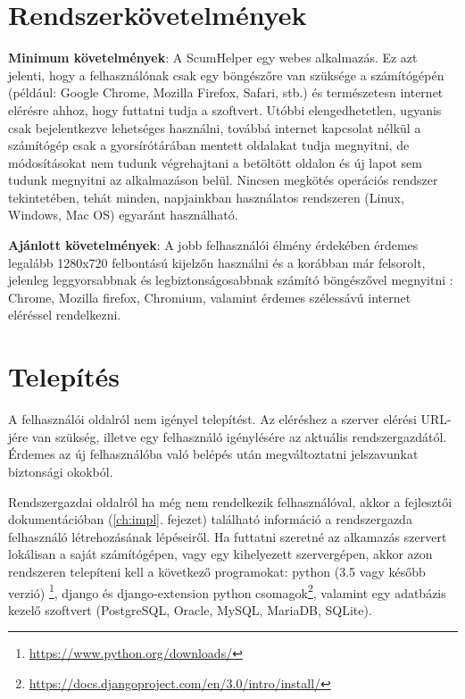 \newpage

\section{Rendszerkövetelmények} %

\textbf{Minimum követelmények}: A ScumHelper egy webes alkalmazás. Ez azt jelenti, hogy a felhasználónak csak egy böngészőre van szüksége a számítógépén (például: Google Chrome, Mozilla Firefox, Safari, stb.) és természetesn internet elérésre ahhoz, hogy futtatni tudja a szoftvert. Utóbbi elengedhetetlen, ugyanis csak bejelentkezve lehetséges használni, továbbá internet kapcsolat nélkül a számítógép csak a gyorsírótárában mentett oldalakat tudja megnyitni, de módosításokat nem tudunk végrehajtani a betöltött oldalon és új lapot sem tudunk megnyitni az alkalmazáson belül. Nincsen megkötés operációs rendszer tekintetében, tehát minden, napjainkban használatos rendszeren (Linux, Windows, Mac OS) egyaránt használható. 

\textbf{Ajánlott követelmények}: A jobb felhasználói élmény érdekében érdemes legalább 1280x720 felbontású kijelzőn használni és a korábban már felsorolt, jelenleg leggyorsabbnak és legbiztonságosabbnak számító böngészővel megnyitni : Chrome, Mozilla firefox, Chromium, valamint érdemes szélessávú internet eléréssel rendelkezni.

\section{Telepítés}
\label{install}

A felhasználói oldalról nem igényel telepítést. Az eléréshez a szerver elérési URL-jére van szükség, illetve egy felhasználó igénylésére az aktuális rendszergazdától. Érdemes az új felhasználóba való belépés után megváltoztatni jelszavunkat biztonsági okokból.

Rendszergazdai oldalról ha még nem rendelkezik felhasználóval, akkor a fejlesztői dokumentációban (\ref{ch:impl}. fejezet) található információ a rendszergazda felhasználó létrehozásának lépéseiről.  Ha futtatni szeretné az alkamazás szervert lokálisan a saját számítógépen, vagy egy kihelyezett szervergépen, akkor azon rendszeren telepíteni kell a következő programokat:  python (3.5 vagy később verzió) \footnote{\url{https://www.python.org/downloads/}}, django és django-extension python csomagok\footnote{\url{https://docs.djangoproject.com/en/3.0/intro/install/}}, valamint egy adatbázis kezelő szoftvert (PostgreSQL, Oracle, MySQL, MariaDB, SQLite).


